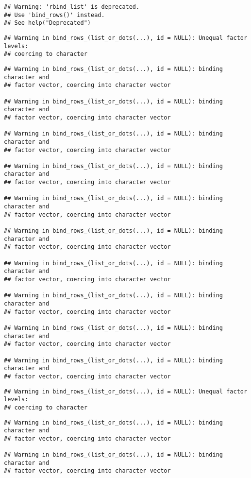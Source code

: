 \documentclass[]{article}
\begin{document}
\begin{verbatim}
## Warning: 'rbind_list' is deprecated.
## Use 'bind_rows()' instead.
## See help("Deprecated")
\end{verbatim}

\begin{verbatim}
## Warning in bind_rows_(list_or_dots(...), id = NULL): Unequal factor levels:
## coercing to character
\end{verbatim}

\begin{verbatim}
## Warning in bind_rows_(list_or_dots(...), id = NULL): binding character and
## factor vector, coercing into character vector

## Warning in bind_rows_(list_or_dots(...), id = NULL): binding character and
## factor vector, coercing into character vector

## Warning in bind_rows_(list_or_dots(...), id = NULL): binding character and
## factor vector, coercing into character vector

## Warning in bind_rows_(list_or_dots(...), id = NULL): binding character and
## factor vector, coercing into character vector

## Warning in bind_rows_(list_or_dots(...), id = NULL): binding character and
## factor vector, coercing into character vector

## Warning in bind_rows_(list_or_dots(...), id = NULL): binding character and
## factor vector, coercing into character vector

## Warning in bind_rows_(list_or_dots(...), id = NULL): binding character and
## factor vector, coercing into character vector

## Warning in bind_rows_(list_or_dots(...), id = NULL): binding character and
## factor vector, coercing into character vector

## Warning in bind_rows_(list_or_dots(...), id = NULL): binding character and
## factor vector, coercing into character vector

## Warning in bind_rows_(list_or_dots(...), id = NULL): binding character and
## factor vector, coercing into character vector
\end{verbatim}

\begin{verbatim}
## Warning in bind_rows_(list_or_dots(...), id = NULL): Unequal factor levels:
## coercing to character
\end{verbatim}

\begin{verbatim}
## Warning in bind_rows_(list_or_dots(...), id = NULL): binding character and
## factor vector, coercing into character vector

## Warning in bind_rows_(list_or_dots(...), id = NULL): binding character and
## factor vector, coercing into character vector
\end{verbatim}
\end{document}
